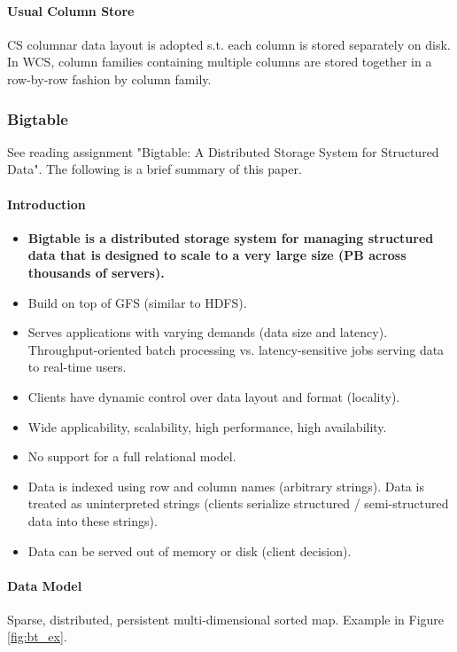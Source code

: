 \paragraph{Usual Column Store}
CS columnar data layout is adopted s.t. each column is stored separately on disk. In WCS, column families containing multiple columns are stored together in a row-by-row fashion by column family.


\subsubsection{Bigtable}

See reading assignment "Bigtable: A Distributed Storage System for Structured Data". The following is a brief summary of this paper.

\paragraph{Introduction}
\begin{itemize}
    \item \textbf{Bigtable is a distributed storage system for managing structured data that is designed to scale to a very large size (PB across thousands of servers).}
    \item Build on top of GFS (similar to HDFS).
    \item Serves applications with varying demands (data size and latency). Throughput-oriented batch processing vs. latency-sensitive jobs serving data to real-time users.
    \item Clients have dynamic control over data layout and format (locality).
    \item Wide applicability, scalability, high performance, high availability.
    \item No support for a full relational model.
    \item Data is indexed using row and column names (arbitrary strings). Data is treated as uninterpreted strings (clients serialize structured / semi-structured data into these strings).
    \item Data can be served out of memory or disk (client decision).
\end{itemize}

\paragraph{Data Model}
Sparse, distributed, persistent multi-dimensional sorted map. Example in Figure \ref{fig:bt_ex}.

